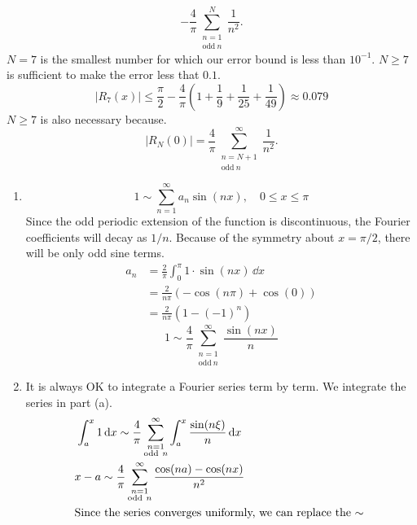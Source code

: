{\begin{Solution}
\[  - \frac{4}{\pi} \sum_{\substack{n = 1 \\ \mathrm{odd}\ n}}^N 
  \frac{1}{n^2}.
  \]
  $N = 7$ is the smallest number for which our error bound is less than $10^{-1}$.
  $N \geq 7$ is sufficient to make the error less that $0.1$.
  \[
  |R_7(x)| \leq \frac{\pi}{2} - \frac{4}{\pi} \left( 1 + \frac{1}{9}
    + \frac{1}{25} + \frac{1}{49} \right) \approx 0.079
  \]
  $N \geq 7$ is also necessary because.
  \[
  |R_N(0)| = \frac{4}{\pi} \sum_{\substack{n = N+1 \\ \mathrm{odd}\ n}}^\infty 
  \frac{1}{n^2}.
  \]
\end{Solution}





\begin{Solution}
  \begin{enumerate}
  \item
    \[
    1 \sim \sum_{n = 1}^\infty a_n \sin(n x), \quad 0 \leq x \leq \pi 
    \]
    Since the odd periodic extension of the function is discontinuous, the 
    Fourier coefficients will decay as $1/n$.  Because of the symmetry about
    $x = \pi / 2$, there will be only odd sine terms.
    \begin{align*}
      a_n     &= \frac{2}{\pi} \int_0^\pi 1 \cdot \sin(n x) \,\dd x \\
      &= \frac{2}{n \pi} ( - \cos(n \pi) + \cos(0) ) \\
      &= \frac{2}{n \pi} (1 - (-1)^n)
    \end{align*}
    \[
    \boxed{
      1 \sim \frac{4}{\pi} \sum_{\substack{n = 1 \\ \mathrm{odd}\ n}}^\infty
      \frac{ \sin(n x) }{n}
      }
    \]
  \item
    It is always OK to integrate a Fourier series term by term.  We integrate 
    the series in part (a).  
    \begin{gather*}
      \int_a^x 1 \,\mathrm{d} x \sim \frac{4}{\pi} 
      \sum_{\substack{n = 1 \\ \mathrm{odd}\ n}}^\infty
      \int_a^x \frac{ \sin(n \xi) }{n} \,\mathrm{d} x \\
      x - a \sim \frac{4}{\pi} 
      \sum_{\substack{n = 1 \\ \mathrm{odd}\ n}}^\infty
      \frac{\cos(n a) - \cos(n x) }{ n^2 } \\
      \intertext{Since the series converges uniformly, we can replace the $\sim$
}
\end{gather*}
\end{enumerate}
\end{Solution}}
